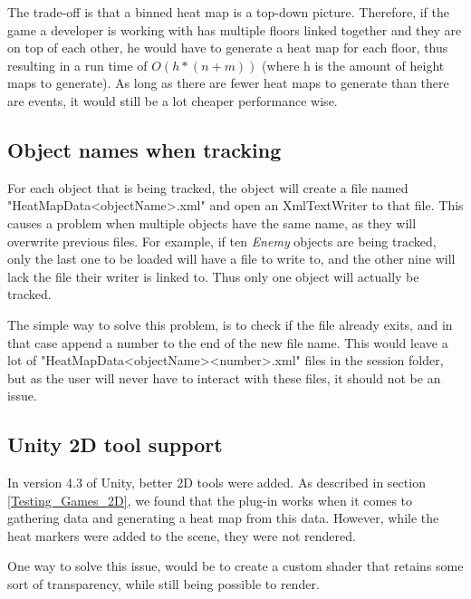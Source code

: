 The trade-off is that a binned heat map is a top-down picture. Therefore, if the game a developer is working with has multiple floors linked together and they are on top of each other, he would have to generate a heat map for each floor, thus resulting in a run time of $O(h * (n + m))$ (where h is the amount of height maps to generate). As long as there are fewer heat maps to generate than there are events, it would still be a lot cheaper performance wise.


\subsection{Object names when tracking}
\label{Issues_UniqueNames}

For each object that is being tracked, the object will create a file named "HeatMapData<objectName>.xml" and open an XmlTextWriter to that file. This causes a problem when multiple objects have the same name, as they will overwrite previous files. For example, if ten \textit{Enemy} objects are being tracked, only the last one to be loaded will have a file to write to, and the other nine will lack the file their writer is linked to. Thus only one object will actually be tracked.

The simple way to solve this problem, is to check if the file already exits, and in that case append a number to the end of the new file name. This would leave a lot of "HeatMapData<objectName><number>.xml" files in the session folder, but as the user will never have to interact with these files, it should not be an issue.

\subsection{Unity 2D tool support}
\label{Issues_2DSupport}

In version 4.3 of Unity, better 2D tools were added. As described in section \ref{Testing_Games_2D}, we found that the plug-in works when it comes to gathering data and generating a heat map from this data. However, while the heat markers were added to the scene, they were not rendered.

One way to solve this issue, would be to create a custom shader that retains some sort of transparency, while still being possible to render.